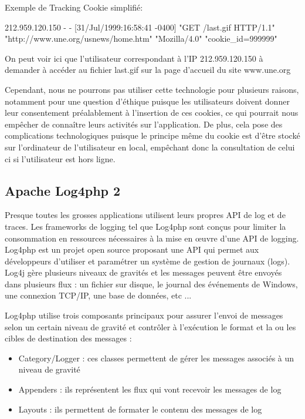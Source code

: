     Exemple de Tracking Cookie simplifié: 
    
    212.959.120.150 - - [31/Jul/1999:16:58:41 -0400] "GET /last.gif HTTP/1.1" "http://www.une.org/usnews/home.htm" "Mozilla/4.0" "cookie_id=999999"
    
    On peut voir ici que l'utilisateur correspondant à l'IP 212.959.120.150 à demander à accéder au fichier last.gif sur la page d'accueil du site www.une.org
    
    Cependant, nous ne pourrons pas utiliser cette technologie pour plusieurs raisons, notamment pour une question d'éthique puisque les utilisateurs doivent donner leur consentement préalablement à l'insertion de ces cookies, ce qui pourrait nous empêcher de connaître leurs activités sur l'application. De plus, cela pose des complications technologiques puisque le principe même du cookie est d'être stocké sur l'ordinateur de l'utilisateur en local, empêchant donc la consultation de celui ci si l'utilisateur est hors ligne.
    
    \subsection{Apache Log4php 2}
    
    
    Presque toutes les grosses applications utilisent leurs propres API de log et de traces. Les frameworks de logging tel que Log4php sont conçus pour limiter la consommation en ressources nécessaires à la mise en œuvre d'une API de logging.
    Log4php est un projet open source proposant une API qui permet aux développeurs d'utiliser et paramétrer un système de gestion de journaux (logs). Log4j gère plusieurs niveaux de gravités et les messages peuvent être envoyés dans plusieurs flux : un fichier sur disque, le journal des événements de Windows, une connexion TCP/IP, une base de données, etc ...
   
   Log4php utilise trois composants principaux pour assurer l'envoi de messages selon un certain niveau de gravité et contrôler à l'exécution le format et la ou les cibles de destination des messages :

\begin{itemize}
	\item Category/Logger : ces classes permettent de gérer les messages associés à un niveau de gravité
    \item Appenders : ils représentent les flux qui vont recevoir les messages de log
    \item Layouts : ils permettent de formater le contenu des messages de log

\end{itemize}


